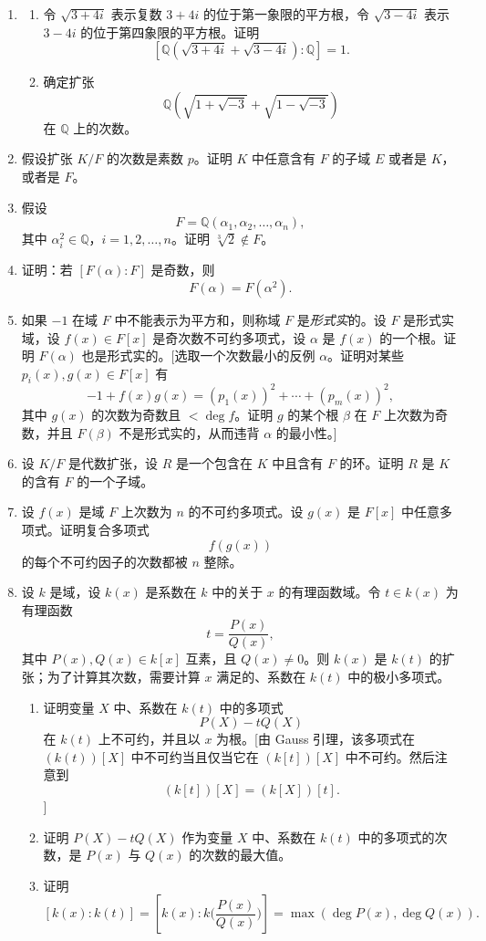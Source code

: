 \begin{enumerate}[label=\arabic*.]
	\item
	\begin{enumerate}[label=(\alph*)]
		\item 令 $\sqrt{3+4i}$ 表示复数 $3+4i$ 的位于第一象限的平方根，令 $\sqrt{3-4i}$ 表示 $3-4i$ 的位于第四象限的平方根。证明
		\[
		[\mathbb Q(\sqrt{3+4i}+\sqrt{3-4i}):\mathbb Q]=1.
		\]
		\item 确定扩张
		\[
		\mathbb Q(\sqrt{1+\sqrt{-3}}+\sqrt{1-\sqrt{-3}})
		\]
		在 $\mathbb Q$ 上的次数。
	\end{enumerate}
	
	\item 假设扩张 $K/F$ 的次数是素数 $p$。证明 $K$ 中任意含有 $F$ 的子域 $E$ 或者是 $K$，或者是 $F$。
	
	\item 假设
	\[
	F=\mathbb Q(\alpha_1,\alpha_2,\ldots,\alpha_n),
	\]
	其中 $\alpha_i^2\in\mathbb Q$，$i=1,2,\ldots,n$。证明 $\sqrt[3]{2}\notin F$。
	
	\item 证明：若 $[F(\alpha):F]$ 是奇数，则
	\[
	F(\alpha)=F(\alpha^2).
	\]
	
	\item 如果 $-1$ 在域 $F$ 中不能表示为平方和，则称域 $F$ 是\emph{形式实}的。设 $F$ 是形式实域，设 $f(x)\in F[x]$ 是奇次数不可约多项式，设 $\alpha$ 是 $f(x)$ 的一个根。证明 $F(\alpha)$ 也是形式实的。[选取一个次数最小的反例 $\alpha$。证明对某些 $p_i(x),g(x)\in F[x]$ 有
	\[
	-1+f(x)g(x)=(p_1(x))^2+\cdots+(p_m(x))^2,
	\]
	其中 $g(x)$ 的次数为奇数且 $<\deg f$。证明 $g$ 的某个根 $\beta$ 在 $F$ 上次数为奇数，并且 $F(\beta)$ 不是形式实的，从而违背 $\alpha$ 的最小性。]
	
	\item 设 $K/F$ 是代数扩张，设 $R$ 是一个包含在 $K$ 中且含有 $F$ 的环。证明 $R$ 是 $K$ 的含有 $F$ 的一个子域。
	
	\item 设 $f(x)$ 是域 $F$ 上次数为 $n$ 的不可约多项式。设 $g(x)$ 是 $F[x]$ 中任意多项式。证明复合多项式
	\[
	f(g(x))
	\]
	的每个不可约因子的次数都被 $n$ 整除。
	
	\item 设 $k$ 是域，设 $k(x)$ 是系数在 $k$ 中的关于 $x$ 的有理函数域。令 $t\in k(x)$ 为有理函数
	\[
	t=\frac{P(x)}{Q(x)},
	\]
	其中 $P(x),Q(x)\in k[x]$ 互素，且 $Q(x)\neq0$。则 $k(x)$ 是 $k(t)$ 的扩张；为了计算其次数，需要计算 $x$ 满足的、系数在 $k(t)$ 中的极小多项式。
	\begin{enumerate}[label=(\alph*)]
		\item 证明变量 $X$ 中、系数在 $k(t)$ 中的多项式
		\[
		P(X)-tQ(X)
		\]
		在 $k(t)$ 上不可约，并且以 $x$ 为根。[由 Gauss 引理，该多项式在 $(k(t))[X]$ 中不可约当且仅当它在 $(k[t])[X]$ 中不可约。然后注意到
		\[
		(k[t])[X]=(k[X])[t].
		\]]
		\item 证明 $P(X)-tQ(X)$ 作为变量 $X$ 中、系数在 $k(t)$ 中的多项式的次数，是 $P(x)$ 与 $Q(x)$ 的次数的最大值。
		\item 证明
		\[
		[k(x):k(t)]=\left[k(x):k\!\bigg(\frac{P(x)}{Q(x)}\bigg)\right]
		=\max(\deg P(x),\deg Q(x)).
		\]
	\end{enumerate}
	

\end{enumerate}
